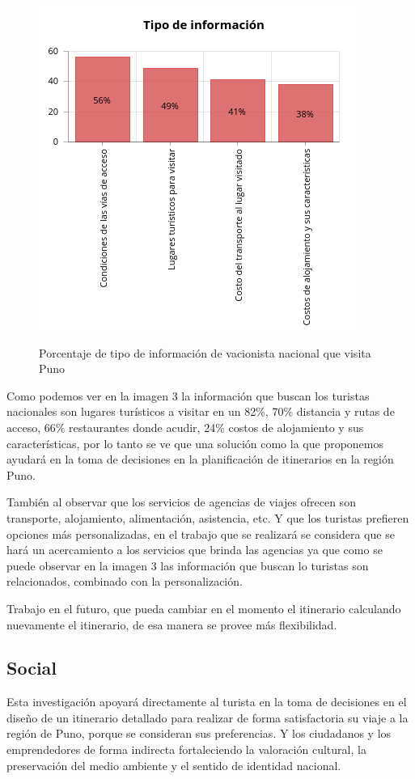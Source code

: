 \begin{figure}[!ht]
    \centering
    \includegraphics[scale=0.7]{Capitulo2/Figs/tipo_informacion_nacional.jpg}
    \caption{Porcentaje de tipo de información de vacionista nacional que visita Puno}
    \cite{2017PerfilNacional}
    \label{fig:tipo_infomacion_nacional}
\end{figure}

Como podemos ver en la imagen 3 la información que buscan los turistas nacionales son lugares turísticos a visitar en un 82\%, 70\% distancia y rutas de acceso, 66\% restaurantes donde acudir, 24\% costos de alojamiento y sus características, por lo tanto se ve que una solución como la que proponemos ayudará en la toma de decisiones en la planificación de itinerarios en la región Puno.

También al observar que los servicios de agencias de viajes ofrecen son transporte, alojamiento, alimentación, asistencia, etc. Y que los turistas prefieren opciones más personalizadas, en el trabajo que se realizará se considera que se hará un acercamiento a los servicios que brinda las agencias ya que como se puede observar en la imagen 3 las información que buscan lo turistas son relacionados, combinado con la personalización.

Trabajo en el futuro, que pueda cambiar en el momento el itinerario calculando nuevamente el itinerario, de esa manera se provee más flexibilidad.
\subsection{Social}
Esta investigación apoyará directamente al turista en la toma de decisiones en el diseño de un itinerario detallado para realizar de forma satisfactoria su viaje a la región de Puno, porque se consideran sus preferencias. Y los ciudadanos y los emprendedores de forma indirecta fortaleciendo la valoración cultural, la preservación del medio ambiente y el sentido de identidad nacional. 
